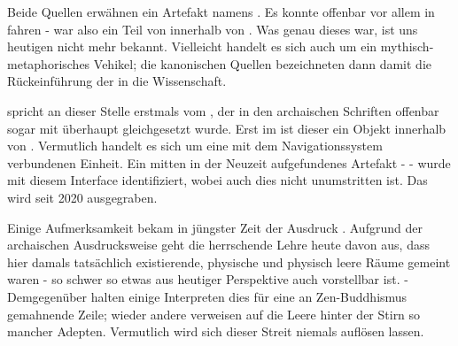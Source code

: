 Beide Quellen erwähnen ein Artefakt namens . Es konnte offenbar vor allem in  fahren - war also ein Teil von  innerhalb von . Was genau dieses war, ist uns heutigen nicht mehr bekannt. Vielleicht handelt es sich auch um ein mythisch-metaphorisches Vehikel; die kanonischen Quellen bezeichneten dann damit die Rückeinführung der  in die Wissenschaft. 

 spricht an dieser Stelle erstmals vom , der in den archaischen Schriften offenbar sogar mit  überhaupt gleichgesetzt wurde. Erst im  ist dieser  ein Objekt innerhalb von . Vermutlich handelt es sich um eine mit dem Navigationssystem verbundenen Einheit. Ein mitten in der Neuzeit aufgefundenes Artefakt -  - wurde mit diesem Interface identifiziert, wobei auch dies nicht unumstritten ist. Das  wird seit 2020 ausgegraben.

Einige Aufmerksamkeit bekam in jüngster Zeit der Ausdruck . Aufgrund der archaischen Ausdrucksweise geht die herrschende Lehre heute davon aus, dass hier damals tatsächlich existierende, physische und physisch leere Räume gemeint waren - so schwer so etwas aus heutiger Perspektive auch vorstellbar ist. - Demgegenüber halten einige Interpreten dies für eine an Zen-Buddhismus gemahnende Zeile; wieder andere verweisen auf die Leere hinter der Stirn so mancher Adepten. Vermutlich wird sich dieser Streit niemals auflösen lassen.

